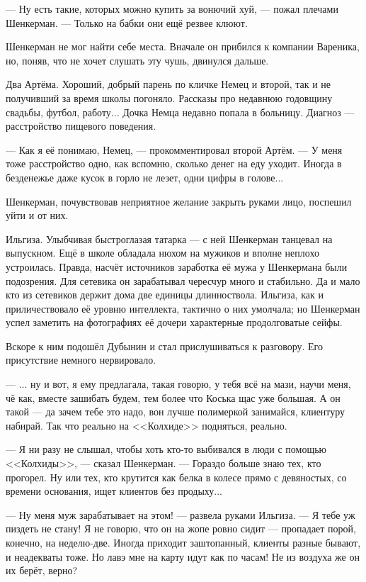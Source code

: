 \documentclass[a4paper,10pt,fleqn]{book}\usepackage{polyglossia}\setdefaultlanguage{english}\setotherlanguage{russian}\defaultfontfeatures{Ligatures=TeX,Mapping=tex-text} \usepackage{xcolor}\definecolor{lightgray}{HTML}{bbbbbb}\color{lightgray}\newcommand{\ml}[3]{\textcolor{black}{#3}}
\newcommand{\textspace}{\vspace{1em}{\centering\Large\bfseries<...>\par}\vspace{1em}}
\begin{document}
--- Ну есть такие, которых можно купить за вонючий хуй, --- пожал плечами Шенкерман.
--- Только на бабки они ещё резвее клюют.

\textspace

Шенкерман не мог найти себе места.
Вначале он прибился к компании Вареника, но, поняв, что не хочет слушать эту чушь, двинулся дальше.

Два Артёма.
Хороший, добрый парень по кличке Немец и второй, так и не получивший за время школы погоняло.
Рассказы про недавнюю годовщину свадьбы, футбол, работу...
Дочка Немца недавно попала в больницу.
Диагноз --- расстройство пищевого поведения.

--- Как я её понимаю, Немец, --- прокомментировал второй Артём.
--- У меня тоже расстройство одно, как вспомню, сколько денег на еду уходит.
Иногда в безденежье даже кусок в горло не лезет, одни цифры в голове...

Шенкерман, почувствовав неприятное желание закрыть руками лицо, поспешил уйти и от них.

Ильгиза.
Улыбчивая быстроглазая татарка --- с ней Шенкерман танцевал на выпускном.
Ещё в школе обладала нюхом на мужиков и вполне неплохо устроилась.
Правда, насчёт источников заработка её мужа у Шенкермана были подозрения.
Для сетевика он зарабатывал чересчур много и стабильно.
Да и мало кто из сетевиков держит дома две единицы длинноствола.
Ильгиза, как и приличествовало её уровню интеллекта, тактично о них умолчала;
но Шенкерман успел заметить на фотографиях её дочери характерные продолговатые сейфы.

Вскоре к ним подошёл Дубынин и стал прислушиваться к разговору.
Его присутствие немного нервировало.

---  ... ну и вот, я ему предлагала, такая говорю, у тебя всё на мази, научи меня, чё как, вместе зашибать будем, тем более что Коська щас уже большая.
А он такой --- да зачем тебе это надо, вон лучше полимеркой занимайся, клиентуру набирай.
Так что реально на <<Колхиде>> подняться, реально.

--- Я ни разу не слышал, чтобы хоть кто-то выбивался в люди с помощью <<Колхиды>>, --- сказал Шенкерман.
--- Гораздо больше знаю тех, кто прогорел.
Ну или тех, кто крутится как белка в колесе прямо с девяностых, со времени основания, ищет клиентов без продыху...

--- Ну меня муж зарабатывает на этом! --- развела руками Ильгиза.
--- Я тебе уж пиздеть не стану!
Я не говорю, что он на жопе ровно сидит --- пропадает порой, конечно, на неделю-две.
Иногда приходит заштопанный, клиенты разные бывают, и неадекваты тоже.
Но лавэ мне на карту идут как по часам!
Не из воздуха же он их берёт, верно?
\end{document}
